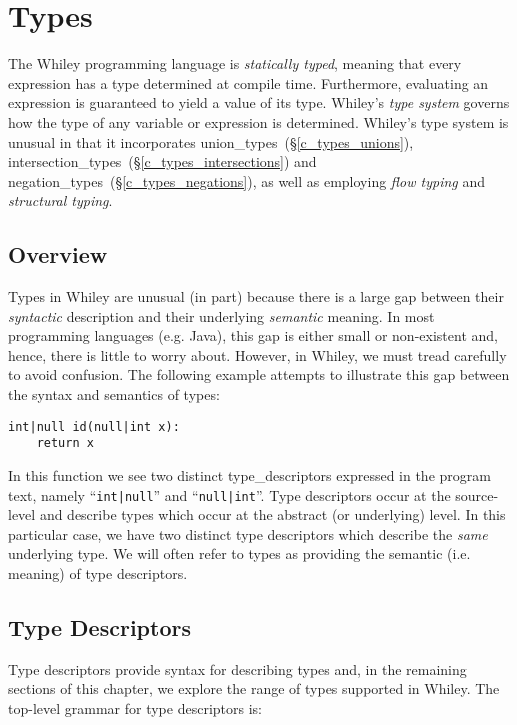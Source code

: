 \chapter{Types}
The Whiley programming language is {\em statically typed}, meaning that every expression has a type determined at compile time.  Furthermore, evaluating an expression is guaranteed to yield a value of its type.  Whiley's {\em type system} governs how the type of any variable or expression is determined.  Whiley's type system is unusual in that it incorporates \gls{union_type}s~(\S\ref{c_types_unions}), \gls{intersection_type}s~(\S\ref{c_types_intersections}) and \gls{negation_type}s~(\S\ref{c_types_negations}), as well as employing {\em flow typing} and {\em structural typing}.

\section{Overview}
\label{c_types_type_overview}

Types in Whiley are unusual (in part) because there is a large gap between their {\em syntactic} description and their underlying {\em semantic} meaning.  In most programming languages (e.g. Java), this gap is either small or non-existent and, hence, there is little to worry about.  However, in Whiley, we must tread carefully to avoid confusion.  The following example attempts to illustrate this gap between the syntax and semantics of types:
\begin{lstlisting}
int|null id(null|int x):
    return x
\end{lstlisting}
In this function we see two distinct \gls{type_descriptor}s expressed in the program text, namely ``\lstinline{int|null}'' and ``\lstinline{null|int}''.  Type descriptors occur at the source-level and describe \gls{type}s which occur at the abstract (or underlying) level.  In this particular case, we have two distinct type descriptors which describe the {\em same} underlying type.  We will often refer to types as providing the semantic (i.e. meaning) of type descriptors.  

\section{Type Descriptors}
\label{c_types_type_descriptors}
Type descriptors provide syntax for describing types and, in the remaining sections of this chapter, we explore the range of types supported in Whiley.  The top-level grammar for type descriptors is:

